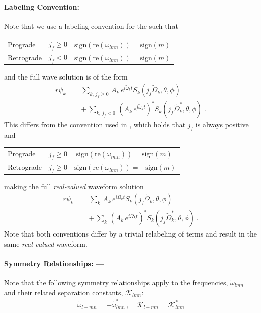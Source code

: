 \documentclass[twocolumn,prd,floatfix,preprintnumbers,a4paper,nofootinbib,superscriptaddress]{revtex4-1}
\newcommand{\cw}{\tilde{\omega}}
\newcommand{\CW}{\tilde{\Omega}}
\newcommand{\SC}{\mathcal{K}}
\def\j{j_f}
\begin{document}
{\paragraph{\qnm{} Labeling Convention: --- } Note that we use a labeling convention for the  such that
%
	\begin{center}
		\begin{tabular}{ |l|c|c| }
			\hline
				Prograde 		&   $\j{} \ge 0$   & $\mathrm{sign}(\mathrm{re}(\omega_{lmn})) = \mathrm{sign}(m)$ \\
				Retrograde  &   $\j{}<0$   & $\mathrm{sign}(\mathrm{re}(\omega_{lmn})) = \mathrm{sign}(m)$ \\
			\hline
		\end{tabular}
	\end{center}
%
and the full wave solution is of the form
%
\begin{align}
	r\psi_k = &\sum_{k,\,\j{} \ge 0} \, A_k \, e^{ i \cw_k t} S_k(\j{}\CW_k,\theta,\phi) \, \\ \nonumber &+ \,  \sum_{k,\,\j{}<0} \, \left( A_k \, e^{i \cw_k t} \right)^* S_k(\j{}\CW_k^*,\theta,\phi) \; .
\end{align}
%
This differs from the convention used in \cite{Berti:2005ys}, which holds that $\j{}$ is always positive and
%
	\begin{center}
		\begin{tabular}{ |l|c|c| }
			\hline
				Prograde 		&   $\j{} \ge 0$   & $\mathrm{sign}(\mathrm{re}(\omega_{lmn})) = \mathrm{sign}(m)\;$ \\
				Retrograde  &   $\j{} \ge 0$   & $\mathrm{sign}(\mathrm{re}(\omega_{lmn})) = -\mathrm{sign}(m)$ \\
			\hline
		\end{tabular}
	\end{center}
%
making the full \textit{real-valued} waveform solution
%
\begin{align}
	r\psi_k = &\sum_{k} \, A_k \, e^{ i \CW_k t} S_k(\j{}\CW_k,\theta,\phi) \,  \\ \nonumber &+ \, \sum_{k} \, \left( A_k \, e^{i \CW_k t}  \right)^* S_k(\j{}\CW_k^*,\theta,\phi) \; .
\end{align}
%
Note that both conventions differ by a trivial relabeling of terms and result in the same \textit{real-valued} waveform.
%
\paragraph{Symmetry Relationships: --- } Note that the following symmetry relationships apply to the \qnm{} frequencies, $\cw_{lmn}$ and their related separation constants, $\SC_{lmn}$:
%
\begin{align}
	\cw_{l-mn} = - \cw_{lmn}^* \, , \quad \SC_{l-mn} = \SC_{lmn}^*
\end{align}
%
}
\end{document}
